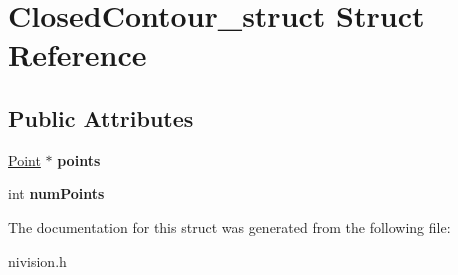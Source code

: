 \hypertarget{structClosedContour__struct}{
\section{ClosedContour\_\-struct Struct Reference}
\label{structClosedContour__struct}
}
\subsection*{Public Attributes}
\begin{DoxyCompactItemize}
\item 
\hypertarget{structClosedContour__struct_a789c302d8fa7e888eeddf608f8b90677}{
\hyperlink{structPoint__struct}{Point} $\ast$ {\bfseries points}}
\label{structClosedContour__struct_a789c302d8fa7e888eeddf608f8b90677}

\item 
\hypertarget{structClosedContour__struct_a38c4adcbacf2d1dc679d6b5887e1df48}{
int {\bfseries numPoints}}
\label{structClosedContour__struct_a38c4adcbacf2d1dc679d6b5887e1df48}

\end{DoxyCompactItemize}


The documentation for this struct was generated from the following file:\begin{DoxyCompactItemize}
\item 
nivision.h\end{DoxyCompactItemize}
